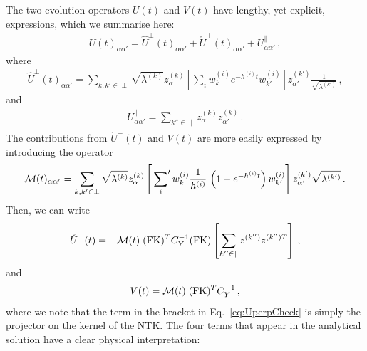 The two evolution operators $U(t)$ and $V(t)$ have lengthy, yet explicit,
expressions, which we summarise here: 
\begin{align}
    \label{eq:UDef}
    U(t)_{\alpha\alpha'} = \hat{U}^\perp(t)_{\alpha\alpha'}
        + \check{U}^\perp(t)_{\alpha\alpha'} + U^\parallel_{\alpha\alpha'}\, ,
\end{align}
where
\begin{align}
    \hat{U}^\perp(t)_{\alpha\alpha'}
        = \sum_{k,k'\in\perp} \sqrt{\lambda^{(k)}} z^{(k)}_\alpha 
            \left[\sum_i w^{(i)}_{k} e^{-h^{(i)}t} w^{(i)}_{k'}\right]
            z^{(k')}_{\alpha'} \frac{1}{\sqrt{\lambda^{(k')}}}\, ,
\end{align}
and
\begin{align}
    U^\parallel_{\alpha\alpha'}
        = \sum_{k''\in\parallel} z^{(k)}_\alpha z^{(k)}_{\alpha'} \, .
\end{align}
The contributions from $\check{U}^\perp(t)$ and $V(t)$ are more easily expressed
by introducing the operator
\begin{align}
    \label{eq:MOperatorDef}
    \mathcal{M}(t)_{\alpha\alpha'} 
        = \sum_{k,k'\in\perp} \sqrt{\lambda^{(k)}} z^{(k)}_\alpha 
            \left[\sideset{}{'}\sum_{i} w^{(i)}_{k} \frac{1}{h^{(i)}}\, 
            \left( 1- e^{-h^{(i)}t}\right) w^{(i)}_{k'}\right]
            z^{(k')}_{\alpha'} \sqrt{\lambda^{(k')}}\,. 
\end{align}
Then, we can write
\begin{align}
    \label{eq:UperpCheck}
    \check{U}^\perp(t)
        = - \mathcal{M}(t)\; (\mathrm{FK})^T C_Y^{-1} (\mathrm{FK}) 
            \left[\sum_{k''\in\parallel} z^{(k'')} z^{(k'') T}\right]\, ,
\end{align}
and
\begin{align}
    \label{eq:VDef}
    V(t) = \mathcal{M}(t)\; (\mathrm{FK})^T C_Y^{-1}\, ,
\end{align}
where we note that the term in the bracket in Eq.~\eqref{eq:UperpCheck} is
simply the projector on the kernel of the NTK. The four terms that appear in the
analytical solution have a clear physical interpretation:

